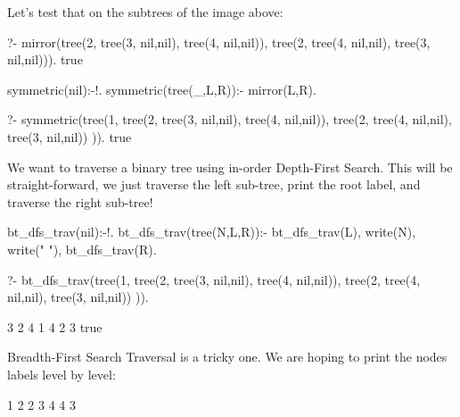 Let's test that on the subtrees of the image above:

\begin{codeblock}
?- mirror(tree(2, tree(3, nil,nil), tree(4, nil,nil)),
       tree(2, tree(4, nil,nil), tree(3, nil,nil))).
true
\end{codeblock}


\begin{codeblock}
symmetric(nil):-!.
symmetric(tree(_,L,R)):-
    mirror(L,R).
\end{codeblock}

\begin{codeblock}
?- symmetric(tree(1, 
             	tree(2, tree(3, nil,nil), tree(4, nil,nil)),
             	tree(2, tree(4, nil,nil), tree(3, nil,nil))
             )).
true
\end{codeblock}


We want to traverse a binary tree using in-order Depth-First Search. This will be straight-forward, we just traverse the left sub-tree, print the root label, and traverse the right sub-tree! 

\begin{codeblock}
bt_dfs_trav(nil):-!.
bt_dfs_trav(tree(N,L,R)):-
    bt_dfs_trav(L),
    write(N), write(" "),
    bt_dfs_trav(R).
\end{codeblock}

\begin{codeblock}
?- bt_dfs_trav(tree(1, 
             	tree(2, tree(3, nil,nil), tree(4, nil,nil)),
             	tree(2, tree(4, nil,nil), tree(3, nil,nil))
             )).

             3 2 4 1 4 2 3
true
\end{codeblock}

Breadth-First Search Traversal is a tricky one. We are hoping to print the nodes labels level by level:
\begin{codeblock}
1 2 2 3 4 4 3
\end{codeblock}

